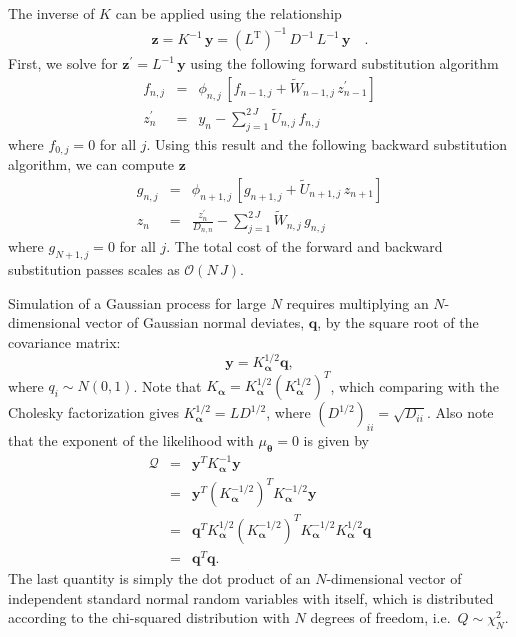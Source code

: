 \documentclass[manuscript, letterpaper]{aastex6}
\makeatletter
\let\origsubsection\subsection
\renewcommand\subsection{\@ifstar{\starsubsection}{\nostarsubsection}}
\newcommand\nostarsubsection[1]{\subsectionprelude\origsubsection{#1}}
\newcommand\starsubsection[1]{\subsectionprelude\origsubsection*{#1}}
\newcommand\subsectionprelude{\vspace{1em}}
\newcommand{\T}{\ensuremath{\mathrm{T}}}
\newcommand{\bvec}[1]{{\ensuremath{\boldsymbol{#1}}}}
\makeatother
\begin{document}
The inverse of $K$ can be applied using the relationship
\begin{eqnarray}
\bvec{z} = K^{-1}\,\bvec{y} = {(L^\T)}^{-1}\,D^{-1}\,L^{-1}\,\bvec{y} \quad.
\end{eqnarray}
First, we solve for $\bvec{z}^\prime = L^{-1}\,\bvec{y}$ using the following forward
substitution algorithm
\begin{eqnarray}
    f_{n,j} &=& \phi_{n,j}\,\left[f_{n-1,j} +
    \tilde{W}_{n-1,j}\,z_{n-1}^\prime\right] \nonumber\\
    z_n^\prime &=& y_n - \sum_{j=1}^{2\,J} \tilde{U}_{n,j}\,f_{n,j}
\end{eqnarray}
where $f_{0,j} = 0$ for all $j$.
Using this result and the following backward substitution algorithm, we can
compute $\bvec{z}$
\begin{eqnarray}
g_{n,j} &=& \phi_{n+1,j}\,\left[g_{n+1,j} +
    \tilde{U}_{n+1,j}\,z_{n+1}\right] \nonumber\\
z_n &=& \frac{z_n^\prime}{D_{n,n}} - \sum_{j=1}^{2\,J} \tilde{W}_{n,j}\,g_{n,j}
\end{eqnarray}
where $g_{N+1,j} = 0$ for all $j$.
The total cost of the forward and backward substitution passes scales as
$\mathcal{O}(N\,J)$.

\subsection{Simulation}

Simulation of a Gaussian process for large $N$ requires multiplying an
$N$-dimensional vector of Gaussian normal deviates, $\bvec{q}$, by the square root
of the covariance matrix:
\begin{equation}
\bvec{y} = K_\bvec{\alpha}^{1/2} \bvec{q},
\end{equation}
where $q_i \sim N(0,1)$.  Note that $K_\bvec{\alpha} = K_\bvec{\alpha}^{1/2} \left(K_\bvec{\alpha}^{1/2}\right)^T$, which
comparing with the Cholesky factorization gives $K_\bvec{\alpha}^{1/2} = L D^{1/2}$,
where $(D^{1/2})_{ii} = \sqrt{D_{ii}}$.  Also note that the exponent of
the likelihood with $\mu_\bvec{\theta} =0$ is given by
\begin{eqnarray}
\mathcal{Q} &=&\bvec{y}^T K_\bvec{\alpha}^{-1} \bvec{y}\\
&=& \bvec{y}^T \left(K_\bvec{\alpha}^{-1/2}\right)^T K_\bvec{\alpha}^{-1/2} \bvec{y}\\
&=& \bvec{q}^T K_\bvec{\alpha}^{1/2} \left(K_\bvec{\alpha}^{-1/2}\right)^T K_\bvec{\alpha}^{-1/2} K_\bvec{\alpha}^{1/2} \bvec{q}\\
&=& \bvec{q}^T \bvec{q}.
\end{eqnarray}
The last quantity is simply the dot product of an $N$-dimensional vector of independent standard normal random variables with itself,
which is distributed according to the chi-squared distribution with $N$ degrees of freedom, i.e.\ $Q \sim \chi_N^2$.
\end{document}

